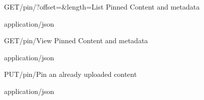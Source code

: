 
\begin{apiRoute}{GET}{/pin/?offset=\&length=}{List Pinned Content and metadata}{
}{ }

\begin{queryParameter} 
\end{queryParameter}
\begin{routeResponse}{application/json}
\end{routeResponse}
\end{apiRoute}


\begin{apiRoute}{GET}{/pin/}{View Pinned Content and metadata}{
}{ }

\begin{queryParameter} 
\end{queryParameter}
\begin{routeResponse}{application/json}
\end{routeResponse}
\end{apiRoute}




\begin{apiRoute}{PUT}{/pin/}{Pin an already uploaded content}{
}{ }

\begin{routeParameter} 
\end{routeParameter}
\begin{routeResponse}{application/json}
\end{routeResponse}
\end{apiRoute}





  
